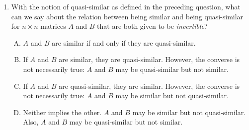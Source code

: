 \documentclass[10pt]{amsart}
\begin{document}
\begin{enumerate}
  {\em Answer}: Option (B)

  {\em Explanation}: If $A$ and $B$ are similar, there exists an
  invertible $n \times n$ matrix $S$ such that $A = SBS^{-1}$. In that
  case, we can set $C = SB$ and $D = D^{-1}$ to obtain that $A = CD$
  and $B = DC$.

  The converse is not necessarily true. To establish a
  counter-example, it suffices to construct matrices $C$ and $D$ such
  that $CD = 0$ but $DC$ is nonzero. If we label $CD$ as $A$ and $DC$
  as $B$, we have constructed quasi-similar matrices that are not
  similar. Here are the examples:

  $$C = \left[\begin{matrix} 0 & 1 \\ 0 & 0 \\\end{matrix}\right], D = \left[\begin{matrix} 1 & 0 \\ 0 & 0 \\\end{matrix}\right]$$

  The products are:

  $$A = \left[\begin{matrix} 0 & 0 \\ 0 & 0 \\\end{matrix}\right], B = \left[\begin{matrix} 0 & 1 \\ 0 & 0 \\\end{matrix}\right]$$

  These are quasi-similar but not similar.

  {\em Performance review}: 5 out of 23 people got this. 15 chose (D),
  2 chose (C), 1 chose (E).

  {\em Historical note (last time)}; $10$ out of $19$ got this. $7$
  chose (D), $2$ chose (C).

\item With the notion of quasi-similar as defined in the preceding
  question, what can we say about the relation between being similar
  and being quasi-similar for $n \times n$ matrices $A$ and $B$ that
  are both given to be {\em invertible}?

  \begin{enumerate}[(A)]
  \item $A$ and $B$ are similar if and only if they are quasi-similar.
  \item If $A$ and $B$ are similar, they are quasi-similar. However,
    the converse is not necessarily true: $A$ and $B$ may be
    quasi-similar but not similar.
  \item If $A$ and $B$ are quasi-similar, they are similar. However,
    the converse is not necessarily true: $A$ and $B$ may be similar
    but not quasi-similar.
  \item Neither implies the other. $A$ and $B$ may be similar but not
    quasi-similar. Also, $A$ and $B$ may be quasi-similar but not
    similar.
  \end{enumerate}


\end{enumerate}
\end{document}
